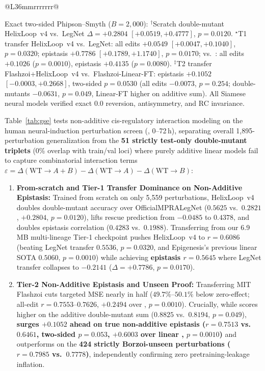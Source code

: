 \documentclass[10.5pt,a4paper]{article}
\begin{document}
\begin{table}[tb]
\begin{tabular}{@{}L{36mm}rrrrrrr@{}}
\bottomrule
\end{tabular}
\vspace{2pt}
{\scriptsize Exact two-sided Phipson--Smyth ($B=2{,}000$): $^\dagger$Scratch double-mutant HelixLoop~v4 vs.\ LegNet $\Delta=+0.2804$ $[+0.0519,+0.4777]$, $p=0.0120$. $^\star$T1 transfer HelixLoop~v4 vs.\ LegNet: all edits $+0.0549$ $[+0.0047,+0.1040]$, $p=0.0320$; epistasis $+0.7786$ $[+0.1789,+1.1740]$, $p=0.0170$; vs.\ : all edits $+0.1026$ ($p=0.0010$), epistasis $+0.4135$ ($p=0.0080$). $^\ddagger$T2 transfer Flashzoi+HelixLoop~v4 vs.\ Flashzoi-Linear-FT: epistasis $+0.1052$ $[-0.0003,+0.2668]$, two-sided $p=0.0530$ (all edits $-0.0073$, $p=0.254$; double-mutants $-0.0631$, $p=0.049$, Linear-FT higher on additive sum). All Siamese neural models verified exact $0.0$ reversion, antisymmetry, and RC invariance.}
\end{table}

Table~\ref{tab:gse} tests non-additive cis-regulatory interaction modeling on the \citet{kreimer2022} human neural-induction perturbation screen (, 0--72\,h), separating overall 1,895-perturbation generalization from the \textbf{51 strictly test-only double-mutant triplets} (0\% overlap with train/val loci) where purely additive linear models fail to capture combinatorial interaction terms $\varepsilon = \Delta(\text{WT}\to A+B) - \Delta(\text{WT}\to A) - \Delta(\text{WT}\to B)$:
\begin{enumerate}
\item \textbf{From-scratch and Tier-1 Transfer Dominance on Non-Additive Epistasis:} Trained from scratch on only 5,559 perturbations, HelixLoop~v4 doubles double-mutant accuracy over OfficialMPRALegNet ($0.5625$ vs.\ $0.2821$, $+0.2804$, $p=0.0120$), lifts rescue prediction from $-0.0485$ to $0.4378$, and doubles epistasis correlation ($0.4283$ vs.\ $0.1988$). Transferring from our 6.9\,MB multi-lineage Tier-1 checkpoint pushes HelixLoop~v4 to $r=0.6086$ (beating LegNet transfer $0.5536$, $p=0.0320$, and Epigenesis's previous linear SOTA  $0.5060$, $p=0.0010$) while achieving \textbf{epistasis $r=0.5645$} where LegNet transfer collapses to $-0.2141$ ($\Delta=+0.7786$, $p=0.0170$).
\item \textbf{Tier-2 Non-Additive Epistasis and Unseen  Proof:} Transferring MIT Flashzoi cuts targeted MSE nearly in half ($49.7\%$--$50.1\%$ below zero-effect; all-edit $r=0.7553$--$0.7626$, $+0.2494$ over , $p=0.0010$). Crucially, while  scores higher on the additive double-mutant sum ($0.8825$ vs.\ $0.8194$, $p=0.049$), \textbf{ surges $+0.1052$ ahead on true non-additive epistasis ($r=0.7513$ vs.\ $0.6461$, two-sided $p=0.053$, $+0.6003$ over linear , $p=0.0010$)} and outperforms  on the \textbf{424 strictly Borzoi-unseen  perturbations ($r=0.7985$ vs.\ $0.7778$)}, independently confirming zero pretraining-leakage inflation.
\end{enumerate}
\end{document}

